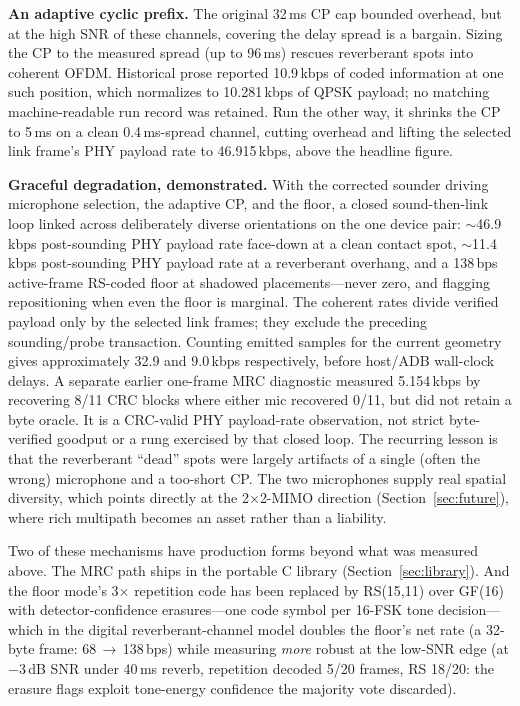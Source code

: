 \documentclass[11pt]{article}
\begin{document}
\textbf{An adaptive cyclic prefix.} The original 32\,ms CP cap bounded overhead,
but at the high SNR of these channels, covering the delay spread is a bargain.
Sizing the CP to the measured spread (up to 96\,ms) rescues reverberant spots
into coherent OFDM. Historical prose reported 10.9\,kbps of coded information
at one such position, which normalizes to 10.281\,kbps of QPSK payload; no
matching machine-readable run record was retained. Run the other way, it shrinks the CP
to 5\,ms on a
clean 0.4\,ms-spread channel, cutting overhead and lifting the selected link
frame's PHY payload rate to 46.915\,kbps,
above the headline figure.

\textbf{Graceful degradation, demonstrated.} With the corrected sounder driving
microphone selection, the adaptive CP, and the floor, a closed sound-then-link loop
linked across deliberately diverse orientations on the one device pair:
$\sim$46.9\,kbps post-sounding PHY payload rate face-down at a clean contact
spot, $\sim$11.4\,kbps post-sounding PHY payload rate at a reverberant overhang,
and a 138\,bps active-frame RS-coded floor at shadowed placements---never zero,
and flagging repositioning when even the floor is marginal. The coherent rates
divide verified payload only by the selected link frames; they exclude the
preceding sounding/probe transaction. Counting emitted samples for the current
geometry gives approximately 32.9 and 9.0\,kbps respectively, before host/ADB
wall-clock delays. A separate earlier one-frame MRC diagnostic measured
5.154\,kbps by recovering 8/11 CRC blocks where either mic recovered 0/11, but
did not retain a byte oracle. It is a CRC-valid PHY payload-rate observation,
not strict byte-verified goodput or a rung exercised by that closed loop.
The recurring lesson is that the reverberant ``dead'' spots were largely artifacts
of a single (often the wrong) microphone and a too-short CP. The two microphones
supply real spatial diversity, which points directly at the 2$\times$2-MIMO
direction (Section~\ref{sec:future}), where rich multipath becomes an asset rather
than a liability.

Two of these mechanisms have production forms beyond what was measured
above. The MRC path ships in the portable C library
(Section~\ref{sec:library}). And the floor mode's 3$\times$ repetition code
has been replaced by RS(15,11) over GF(16) with detector-confidence
erasures---one code symbol per 16-FSK tone decision---which in the digital
reverberant-channel model doubles the floor's net rate (a 32-byte frame:
68\,$\to$\,138\,bps) while measuring \emph{more} robust at the low-SNR edge
(at $-3$\,dB SNR under 40\,ms reverb, repetition decoded 5/20 frames, RS
18/20: the erasure flags exploit tone-energy confidence the majority vote
discarded).
\end{document}
